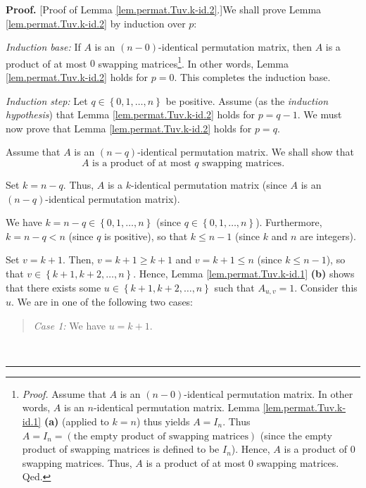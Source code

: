 \documentclass[numbers=enddot,12pt,final,onecolumn,notitlepage]{scrartcl}%
\theoremstyle{definition}
\newenvironment{statement}{\begin{quote}}{\end{quote}}
\newenvironment{proof}[1][Proof]{\noindent\textbf{#1.} }{\ \rule{0.5em}{0.5em}}
\begin{document}
\begin{proof}
[Proof of Lemma \ref{lem.permat.Tuv.k-id.2}.]We shall prove Lemma
\ref{lem.permat.Tuv.k-id.2} by induction over $p$:

\textit{Induction base:} If $A$ is an $\left(  n-0\right)  $-identical
permutation matrix, then $A$ is a product of at most $0$ swapping
matrices\footnote{\textit{Proof.} Assume that $A$ is an $\left(  n-0\right)
$-identical permutation matrix. In other words, $A$ is an $n$-identical
permutation matrix. Lemma \ref{lem.permat.Tuv.k-id.1} \textbf{(a)} (applied to
$k=n$) thus yields $A=I_{n}$. Thus $A=I_{n}=\left(  \text{the empty product of
swapping matrices}\right)  $ (since the empty product of swapping matrices is
defined to be $I_{n}$). Hence, $A$ is a product of $0$ swapping matrices.
Thus, $A$ is a product of at most $0$ swapping matrices. Qed.}. In other
words, Lemma \ref{lem.permat.Tuv.k-id.2} holds for $p=0$. This completes the
induction base.

\textit{Induction step:} Let $q \in\left\{  0,1,\ldots,n\right\}  $ be
positive. Assume (as the \textit{induction hypothesis}) that Lemma
\ref{lem.permat.Tuv.k-id.2} holds for $p=q-1$. We must now prove that Lemma
\ref{lem.permat.Tuv.k-id.2} holds for $p=q$.

Assume that $A$ is an $\left(  n-q\right)  $-identical permutation matrix. We
shall show that
\begin{equation}
A\text{ is a product of at most }q\text{ swapping matrices.}
\label{pf.lem.permat.Tuv.k-id.2.indgoal}%
\end{equation}


Set $k = n-q$. Thus, $A$ is a $k$-identical permutation matrix (since $A$ is
an $\left(  n-q\right)  $-identical permutation matrix).

We have $k=n-q\in\left\{  0,1,\ldots,n\right\}  $ (since $q\in\left\{
0,1,\ldots,n\right\}  $). Furthermore, $k=n-q<n$ (since $q$ is positive), so
that $k\leq n-1$ (since $k$ and $n$ are integers).

Set $v=k+1$. Then, $v=k+1\geq k+1$ and $v=k+1\leq n$ (since $k\leq n-1$), so
that $v\in\left\{  k+1,k+2,\ldots,n\right\}  $. Hence, Lemma
\ref{lem.permat.Tuv.k-id.1} \textbf{(b)} shows that there exists some
$u\in\left\{  k+1,k+2,\ldots,n\right\}  $ such that $A_{u,v}=1$. Consider this
$u$. We are in one of the following two cases:

\begin{statement}
\textit{Case 1:} We have $u=k+1$.
\end{statement}


\end{proof}
\end{document}
